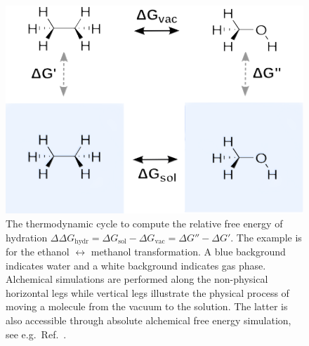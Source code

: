 \documentclass[journal=jctcce,manuscript=article]{achemso}
\begin{document}
\begin{figure}[ht]
  \includegraphics[scale=1.0]{figures/thermocycle.pdf}
  \caption{The thermodynamic cycle to compute the relative free energy
    of hydration
    $\Delta\Delta G_{\mathrm{hydr}}=\Delta G_{\mathrm{sol}}-\Delta
    G_{\mathrm{vac}}=\Delta G'' - \Delta G'$.  The example is for the
    ethanol $\leftrightarrow$ methanol transformation.  A blue background indicates water and a white background indicates gas phase. Alchemical
    simulations are performed along the non-physical horizontal
    legs while vertical legs illustrate the physical process of moving a
    molecule from the vacuum to the solution.  The latter is also accessible
    through absolute alchemical free energy simulation, see e.g.\
    Ref.~.}
  \label{fig:thermocycle}
\end{figure}
\end{document}
